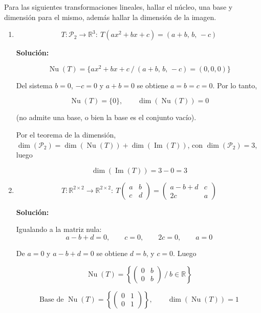 \documentclass[12pt]{article}
\newcommand{\solucion}{%
    \vspace{0.8em}%
    \textbf{Solución:}%
    \vspace{0.8em}%
}
\begin{document}
Para las siguientes transformaciones lineales, hallar el núcleo, una
base y dimensión para el mismo, además hallar la dimensión de la
imagen.

\begin{enumerate}[label=\alph*.-]

    \item
    \[
    T:\mathcal{P}_2\to\mathbb{R}^3:\ T(ax^2+bx+c)=(a+b,\,b,\,-c)
    \]

    \solucion

    \[
    \operatorname{Nu}(T)=\{ax^2+bx+c\ /\ (a+b,\,b,\,-c)=(0,0,0)\}
    \]

    Del sistema $b=0$, $-c=0$ y $a+b=0$ se obtiene $a=b=c=0$. Por lo
    tanto,

    \[
    \boxed{\operatorname{Nu}(T)=\{0\}, \qquad \dim(\operatorname{Nu}(T))=0}
    \]

    (no admite una base, o bien la base es el conjunto vacío).

    Por el teorema de la dimensión, $\dim(\mathcal{P}_2)=\dim(\operatorname{Nu}(T))+\dim(\operatorname{Im}(T))$,
    con $\dim(\mathcal{P}_2)=3$, luego

    \[
    \boxed{\dim(\operatorname{Im}(T))=3-0=3}
    \]

				\newpage
    \item
    \[
    T:\mathbb{R}^{2\times2}\to\mathbb{R}^{2\times2}:\
    T\begin{pmatrix}a&b\\c&d\end{pmatrix}=\begin{pmatrix}a-b+d&c\\2c&a\end{pmatrix}
    \]

    \solucion

    Igualando a la matriz nula:
    \[
    a-b+d=0,\qquad c=0,\qquad 2c=0,\qquad a=0
    \]

    De $a=0$ y $a-b+d=0$ se obtiene $d=b$, y $c=0$. Luego

    \[
    \operatorname{Nu}(T)=\left\{\begin{pmatrix}0&b\\0&b\end{pmatrix}\ /\ b\in\mathbb{R}\right\}
    \]

    \[
    \boxed{
    \text{Base de } \operatorname{Nu}(T)=\left\{\begin{pmatrix}0&1\\0&1\end{pmatrix}\right\},
    \qquad \dim(\operatorname{Nu}(T))=1
    }
    \]


\end{enumerate}
\end{document}
